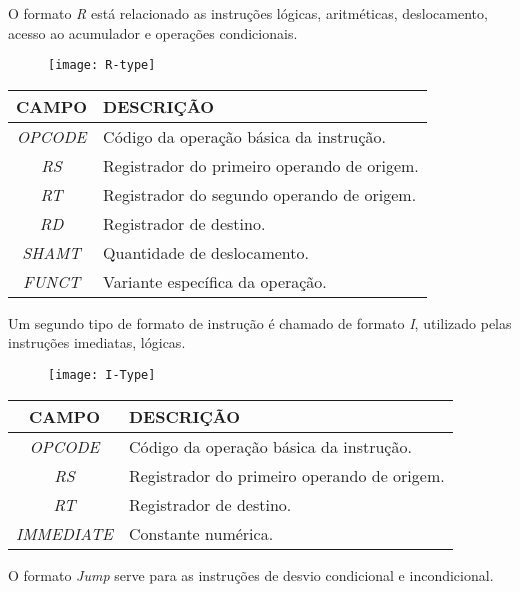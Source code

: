 	O formato \textit{R} está relacionado as instruções lógicas, aritméticas, deslocamento, acesso ao acumulador e operações condicionais.
	\begin{figure}[H]
    	\centering
    	\texttt{[image: R-type]}
	\end{figure}
	
\begin{table}[H]
\centering	
\begin{tabular}{|c|l|}
	\hline 
	\cellcolor[gray]{0.9}\textbf{CAMPO} & \cellcolor[gray]{0.9}\textbf{DESCRIÇÃO} \\ 
	\hline 
	\textit{OPCODE} & Código da operação básica da instrução. \\ 
	\hline 
	\textit{RS} & Registrador do primeiro operando de origem. \\ 
	\hline 
	\textit{RT} & Registrador do segundo operando de origem. \\ 
	\hline 
	\textit{RD} & Registrador de destino. \\ 
	\hline 
	\textit{SHAMT} & Quantidade de deslocamento. \\ 
	\hline 
	\textit{FUNCT} & Variante específica da operação. \\ 
	\hline 
	\end{tabular} 
	\end{table}
	
	Um segundo tipo de formato de instrução é chamado de formato \textit{I}, utilizado pelas instruções imediatas, lógicas.
	\begin{figure}[H]
    	\centering
    	\texttt{[image: I-Type]}
  	\end{figure}
  	
  	\begin{table}[H]
\centering	
\begin{tabular}{|c|l|}
	\hline 
	\cellcolor[gray]{0.9}\textbf{CAMPO} & \cellcolor[gray]{0.9}\textbf{DESCRIÇÃO} \\ 
	\hline 
	\textit{OPCODE} & Código da operação básica da instrução. \\ 
	\hline 
	\textit{RS} & Registrador do primeiro operando de origem. \\ 
	\hline 
	\textit{RT} & Registrador de destino. \\ 
	\hline 
	\textit{IMMEDIATE} & Constante numérica. \\ 
	\hline 
	\end{tabular} 
	\end{table}
	
	O formato \textit{Jump} serve para as instruções de desvio condicional e incondicional. 
 	
